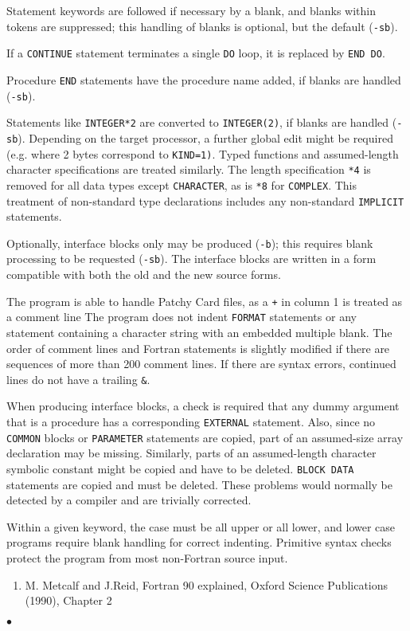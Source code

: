 Statement keywords are
followed if necessary by a blank, and blanks within tokens
are suppressed; this handling of blanks is optional, but the default
(\texttt{-sb}).
 
If a \texttt{CONTINUE} statement terminates a single
\texttt{DO} loop, it is replaced by \texttt{END DO}.
 
Procedure \texttt{END} statements have the procedure name added, if
blanks are handled (\texttt{-sb}).
 
Statements like \texttt{INTEGER*2} are converted to
\texttt{INTEGER(2)}, if blanks are handled (\texttt{-sb}).
Depending on the target processor, a further global
edit might be required (e.g. where 2 bytes correspond to \texttt{KIND=1)}.
Typed functions and assumed-length character specifications are
treated similarly. The length specification \texttt{*4} is removed for all
data types except \texttt{CHARACTER}, as is \texttt{*8} for \texttt{COMPLEX}.
This treatment of non-standard type declarations includes any
non-standard \texttt{IMPLICIT} statements.
 
Optionally, interface blocks only may be produced (\texttt{-b});
this requires blank  processing to be requested (\texttt{-sb}).
The interface blocks are written in a form
compatible with both the old and the new source forms.
 
The program is able to handle    Patchy Card files,
as a \texttt{+} in column 1 is treated as a comment line
\Restrict
The program does not indent \texttt{FORMAT} statements or
any statement containing a character string with an
embedded multiple blank.
The order of comment lines and Fortran statements
is slightly modified if there are sequences of
more than 200 comment lines.
If there are syntax errors, continued lines do not
have a trailing \texttt{\&}.
 
When producing interface blocks, a check is required
that any dummy argument that is a procedure has a
corresponding \texttt{EXTERNAL} statement.
Also, since no
\texttt{COMMON} blocks or \texttt{PARAMETER} statements are copied,
part of an assumed-size array declaration may be
missing. Similarly, parts of an assumed-length
character symbolic constant might be copied and have
to be deleted.
\texttt{BLOCK DATA} statements are copied and
must be deleted.
These problems would normally be
detected by a compiler and are trivially corrected.
 
Within a given keyword, the case must be all upper
or all lower, and lower case programs require
blank handling for correct indenting.
\Errorh
Primitive syntax checks protect the program from most non-Fortran
source input.
\Refer
\begin{enumerate}
\item M. Metcalf and J.Reid, Fortran 90 explained,
Oxford  Science Publications (1990), Chapter 2
\end{enumerate}
$\bullet$
